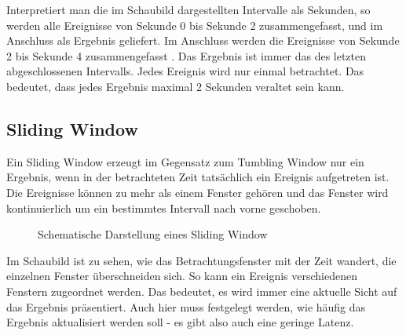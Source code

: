 \documentclass[a4paper,11pt]{scrartcl}
\begin{document}
  Interpretiert man die im Schaubild dargestellten Intervalle als Sekunden, so
  werden alle Ereignisse von Sekunde 0 bis Sekunde 2 zusammengefasst, und im
  Anschluss als Ergebnis geliefert. Im Anschluss werden die Ereignisse von
  Sekunde 2 bis Sekunde 4 zusammengefasst  . Das Ergebnis ist immer das des
  letzten abgeschlossenen Intervalls. Jedes Ereignis wird nur einmal
  betrachtet. Das bedeutet, dass jedes Ergebnis maximal 2 Sekunden veraltet
  sein kann.

  \subsection{Sliding Window}
  Ein Sliding Window erzeugt im Gegensatz zum Tumbling Window nur ein Ergebnis,
  wenn in der betrachteten Zeit tatsächlich ein Ereignis aufgetreten ist. Die
  Ereignisse können zu mehr als einem Fenster gehören und das Fenster wird
  kontinuierlich um ein bestimmtes Intervall nach vorne
  geschoben.\cite[S.~472]{kleppmann17}
  \begin{figure}[!h]
    \centering
    \caption{Schematische Darstellung eines Sliding Window}
  \end{figure}

  Im Schaubild ist zu sehen, wie das Betrachtungsfenster mit der Zeit
  wandert, die einzelnen Fenster überschneiden sich. So kann ein
  Ereignis verschiedenen Fenstern zugeordnet werden. Das bedeutet, es
  wird immer eine aktuelle Sicht auf das Ergebnis präsentiert. Auch
  hier muss festgelegt werden, wie häufig das Ergebnis aktualisiert
  werden soll - es gibt also auch eine geringe Latenz.


\end{document}
